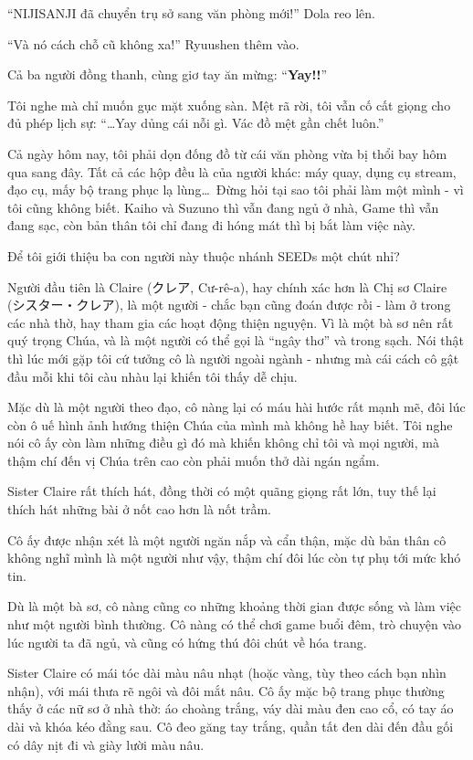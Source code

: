 \documentclass[../main.tex]{subfiles}
\begin{document}
``NIJISANJI đã chuyển trụ sở sang văn phòng mới!'' Dola reo lên.

``Và nó cách chỗ cũ không xa!'' Ryuushen thêm vào.

Cả ba người đồng thanh, cùng giơ tay ăn mừng: ``\textbf{Yay!!}''

Tôi nghe mà chỉ muốn gục mặt xuống sàn. Mệt rã rời, tôi vẫn cố cất giọng cho đủ phép lịch sự: ``\dots Yay dủng cái nỗi gì. Vác đồ mệt gần chết luôn.''

Cả ngày hôm nay, tôi phải dọn đống đồ từ cái văn phòng vừa bị thổi bay hôm qua sang đây. Tất cả các hộp đều là của người khác: máy quay, dụng cụ stream, đạo cụ, mấy bộ trang phục lạ lùng\dots\ Đừng hỏi tại sao tôi phải làm một mình - vì tôi cũng không biết. Kaiho và Suzuno thì vẫn đang ngủ ở nhà, Game thì vẫn đang sạc, còn bản thân tôi chỉ đang đi hóng mát thì bị bắt làm việc này.


Để tôi giới thiệu ba con người này thuộc nhánh SEEDs một chút nhỉ?

\chrint

Người đầu tiên là Claire (クレア, Cư-rê-a), hay chính xác hơn là Chị sơ Claire (シスター・クレア), là một người - chắc bạn cũng đoán được rồi - làm ở trong các nhà thờ, hay tham gia các hoạt động thiện nguyện. Vì là một bà sơ nên rất quý trọng Chúa, và là một người có thể gọi là ``ngây thơ'' và trong sạch. Nói thật thì lúc mới gặp tôi cứ tưởng cô là người ngoài ngành - nhưng mà cái cách cô gật đầu mỗi khi tôi càu nhàu lại khiến tôi thấy dễ chịu.

Mặc dù là một người theo đạo, cô nàng lại có máu hài hước rất mạnh mẽ, đôi lúc còn ô uế hình ảnh hướng thiện Chúa của mình mà không hề hay biết. Tôi nghe nói cô ấy còn làm những điều gì đó mà khiến không chỉ tôi và mọi người, mà thậm chí đến vị Chúa trên cao còn phải muốn thở dài ngán ngẩm.

Sister Claire rất thích hát, đồng thời có một quãng giọng rất lớn, tuy thế lại thích hát những bài ở nốt cao hơn là nốt trầm.

Cô ấy được nhận xét là một người ngăn nắp và cẩn thận, mặc dù bản thân cô không nghĩ mình là một người như vậy, thậm chí đôi lúc còn tự phụ tới mức khó tin.

Dù là một bà sơ, cô nàng cũng co những khoảng thời gian được sống và làm việc như một người bình thường. Cô nàng có thể chơi game buổi đêm, trò chuyện vào lúc người ta đã ngủ, và cũng có hứng thú đôi chút về hóa trang.

Sister Claire có mái tóc dài màu nâu nhạt (hoặc vàng, tùy theo cách bạn nhìn nhận), với mái thưa rẽ ngôi và đôi mắt nâu. Cô ấy mặc bộ trang phục thường thấy ở các nữ sơ ở nhà thờ: áo choàng trắng, váy dài màu đen cao cổ, có tay áo dài và khóa kéo đằng sau. Cô đeo găng tay trắng, quần tất đen dài đến đầu gối có dây nịt đi và giày lười màu nâu.
\end{document}
